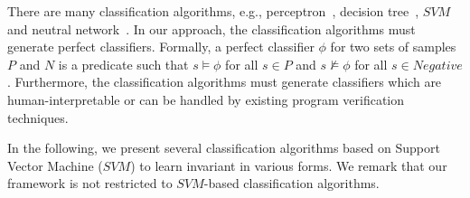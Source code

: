 There are many classification algorithms, e.g., perceptron~\cite{perceptron}, decision tree~\cite{quinlan1986induction}, $\mathit{SVM}$~\cite{svm:original} and neutral network~\cite{nn}.
In our approach, the classification algorithms must generate perfect classifiers. Formally, a perfect classifier $\phi$ for two sets of samples $P$ and $N$ is a predicate such that $s \models \phi$ for all $s \in P$ and $s \not \models \phi$ for all $s \in Negative$. Furthermore, the classification algorithms must generate classifiers which are human-interpretable or can be handled by existing program verification techniques.

In the following, we present several classification algorithms based on Support Vector Machine ($\mathit{SVM}$) to learn invariant in various forms.
We remark that our framework is not restricted to $\mathit{SVM}$-based classification algorithms.

